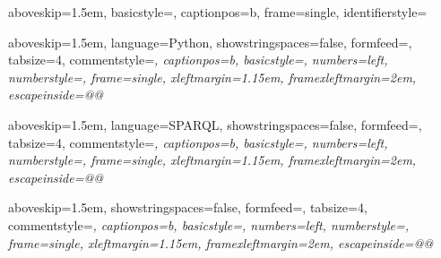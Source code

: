  {
    aboveskip=1.5em,
    basicstyle=\ttfamily\footnotesize,
    captionpos=b,
    frame=single, 
    identifierstyle=
}

 {
    aboveskip=1.5em,
    language=Python,
    showstringspaces=false,
    formfeed=\newpage,
    tabsize=4,
    commentstyle=\itshape,
    captionpos=b,
    basicstyle=\ttfamily\footnotesize,
    numbers=left, 
    numberstyle=\scriptsize, 
    frame=single, 
    xleftmargin=1.15em,     
    framexleftmargin=2em,
    escapeinside={@}{@}
}

 {
    aboveskip=1.5em,
    language=SPARQL,
    showstringspaces=false,
    formfeed=\newpage,
    tabsize=4,
    commentstyle=\itshape,
    captionpos=b,
    basicstyle=\ttfamily\footnotesize,
    numbers=left, 
    numberstyle=\scriptsize, 
    frame=single, 
    xleftmargin=1.15em,     
    framexleftmargin=2em,
    escapeinside={@}{@}
}

 {
    aboveskip=1.5em,
    showstringspaces=false,
    formfeed=\newpage,
    tabsize=4,
    commentstyle=\itshape,
    captionpos=b,
    basicstyle=\ttfamily\footnotesize,
    numbers=left, 
    numberstyle=\scriptsize, 
    frame=single, 
    xleftmargin=1.15em,     
    framexleftmargin=2em,
    escapeinside={@}{@}
}

\usetikzlibrary{
    arrows,
    backgrounds,
    calc,
    chains,
    decorations.markings,
    decorations.pathmorphing,
    fit,
    matrix,
    patterns,
    plotmarks,
    positioning,
    shadows,
    shapes
}


\makeatletter
{}
\makeatother

